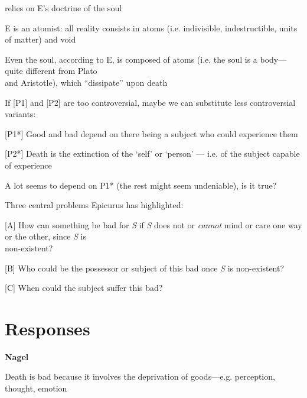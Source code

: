 \documentclass[11pt]{article}
\begin{document}
\noindent [P2] relies on E's doctrine of the soul
\vspace*{1mm}

E is an atomist: all reality consists in atoms (i.e. indivisible, indestructible, units of matter) and void
\vspace*{1mm}

Even the soul, according to E, is composed of atoms (i.e. the soul is a body---quite different from Plato\\\hspace*{6mm}and Aristotle), which ``dissipate'' upon death
\vspace*{2mm}

\noindent If [P1] and [P2] are too controversial, maybe we can substitute less controversial variants:
\vspace*{2mm}

[P1*] Good and bad depend on there being a subject who could experience them
\vspace*{1mm}

[P2*] Death is the extinction of the `self' or `person' --- i.e. of the subject capable of experience
\vspace*{2mm}

\noindent A lot seems to depend on P1* (the rest might seem undeniable), is it true?
\vspace*{2mm}

\noindent Three central problems Epicurus has highlighted:
\vspace*{2mm}

[A] How can something be bad for \emph{S} if \emph{S} does not or \emph{cannot} mind or care one way or the other, since \emph{S} is\\\hspace*{13mm}non-existent?
\vspace*{1mm}

[B] Who could be the possessor or subject of this bad once \emph{S} is non-existent?
\vspace*{1mm}

[C] When could the subject suffer this bad?
\newpage

\section*{Responses}

\noindent \textbf{Nagel}
\vspace*{2mm}

\noindent [1] Death is bad because it involves the deprivation of goods---e.g. perception, thought, emotion
\vspace*{1mm}
\end{document}
